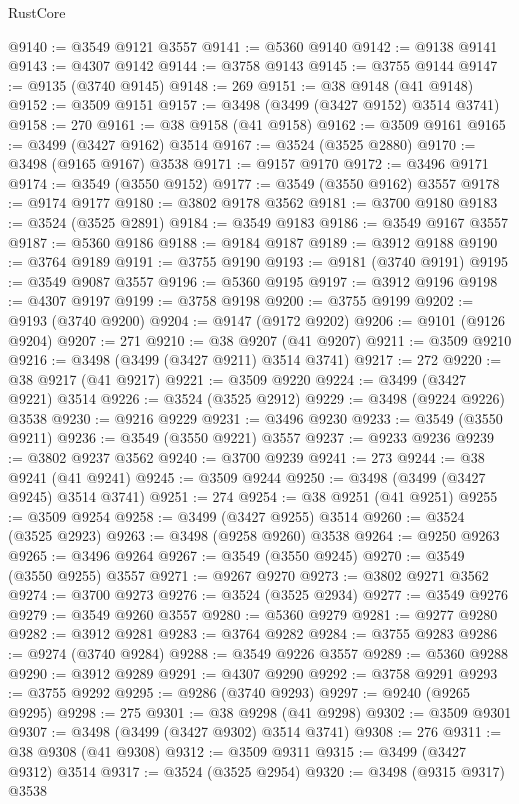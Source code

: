 \begin{lexlean}{RustCore}
\begin{coremodule}
@9140 := @3549 @9121 @3557
@9141 := @5360 @9140
@9142 := @9138 @9141
@9143 := @4307 @9142
@9144 := @3758 @9143
@9145 := @3755 @9144
@9147 := @9135 (@3740 @9145)
@9148 := 269
@9151 := @38 @9148 (@41 @9148)
@9152 := @3509 @9151
@9157 := @3498 (@3499 (@3427 @9152) @3514 @3741)
@9158 := 270
@9161 := @38 @9158 (@41 @9158)
@9162 := @3509 @9161
@9165 := @3499 (@3427 @9162) @3514
@9167 := @3524 (@3525 @2880)
@9170 := @3498 (@9165 @9167) @3538
@9171 := @9157 @9170
@9172 := @3496 @9171
@9174 := @3549 (@3550 @9152)
@9177 := @3549 (@3550 @9162) @3557
@9178 := @9174 @9177
@9180 := @3802 @9178 @3562
@9181 := @3700 @9180
@9183 := @3524 (@3525 @2891)
@9184 := @3549 @9183
@9186 := @3549 @9167 @3557
@9187 := @5360 @9186
@9188 := @9184 @9187
@9189 := @3912 @9188
@9190 := @3764 @9189
@9191 := @3755 @9190
@9193 := @9181 (@3740 @9191)
@9195 := @3549 @9087 @3557
@9196 := @5360 @9195
@9197 := @3912 @9196
@9198 := @4307 @9197
@9199 := @3758 @9198
@9200 := @3755 @9199
@9202 := @9193 (@3740 @9200)
@9204 := @9147 (@9172 @9202)
@9206 := @9101 (@9126 @9204)
@9207 := 271
@9210 := @38 @9207 (@41 @9207)
@9211 := @3509 @9210
@9216 := @3498 (@3499 (@3427 @9211) @3514 @3741)
@9217 := 272
@9220 := @38 @9217 (@41 @9217)
@9221 := @3509 @9220
@9224 := @3499 (@3427 @9221) @3514
@9226 := @3524 (@3525 @2912)
@9229 := @3498 (@9224 @9226) @3538
@9230 := @9216 @9229
@9231 := @3496 @9230
@9233 := @3549 (@3550 @9211)
@9236 := @3549 (@3550 @9221) @3557
@9237 := @9233 @9236
@9239 := @3802 @9237 @3562
@9240 := @3700 @9239
@9241 := 273
@9244 := @38 @9241 (@41 @9241)
@9245 := @3509 @9244
@9250 := @3498 (@3499 (@3427 @9245) @3514 @3741)
@9251 := 274
@9254 := @38 @9251 (@41 @9251)
@9255 := @3509 @9254
@9258 := @3499 (@3427 @9255) @3514
@9260 := @3524 (@3525 @2923)
@9263 := @3498 (@9258 @9260) @3538
@9264 := @9250 @9263
@9265 := @3496 @9264
@9267 := @3549 (@3550 @9245)
@9270 := @3549 (@3550 @9255) @3557
@9271 := @9267 @9270
@9273 := @3802 @9271 @3562
@9274 := @3700 @9273
@9276 := @3524 (@3525 @2934)
@9277 := @3549 @9276
@9279 := @3549 @9260 @3557
@9280 := @5360 @9279
@9281 := @9277 @9280
@9282 := @3912 @9281
@9283 := @3764 @9282
@9284 := @3755 @9283
@9286 := @9274 (@3740 @9284)
@9288 := @3549 @9226 @3557
@9289 := @5360 @9288
@9290 := @3912 @9289
@9291 := @4307 @9290
@9292 := @3758 @9291
@9293 := @3755 @9292
@9295 := @9286 (@3740 @9293)
@9297 := @9240 (@9265 @9295)
@9298 := 275
@9301 := @38 @9298 (@41 @9298)
@9302 := @3509 @9301
@9307 := @3498 (@3499 (@3427 @9302) @3514 @3741)
@9308 := 276
@9311 := @38 @9308 (@41 @9308)
@9312 := @3509 @9311
@9315 := @3499 (@3427 @9312) @3514
@9317 := @3524 (@3525 @2954)
@9320 := @3498 (@9315 @9317) @3538

\end{coremodule}
\end{lexlean}
